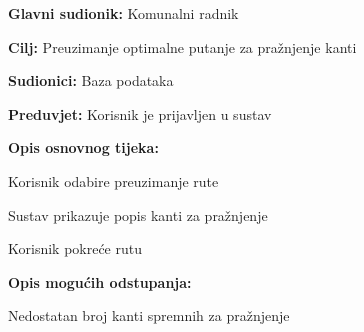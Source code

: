 	\noindent {}
					\begin{packed_item}
	
						\item \textbf{Glavni sudionik: } Komunalni radnik
						\item  \textbf{Cilj:} Preuzimanje optimalne putanje za pražnjenje kanti
						\item  \textbf{Sudionici:} Baza podataka
						\item  \textbf{Preduvjet:} Korisnik je prijavljen u sustav
						\item  \textbf{Opis osnovnog tijeka:}
						
						\item[] \begin{packed_enum}
	
							\item Korisnik odabire preuzimanje rute
							\item Sustav prikazuje popis kanti za pražnjenje
							\item Korisnik pokreće rutu
						\end{packed_enum}
						
						\item  \textbf{Opis mogućih odstupanja:}
						
						\item[] \begin{packed_item}
	
							\item[1.a] Nedostatan broj kanti spremnih za pražnjenje 
							
							\item[] \begin{packed_enum}
								
								\item 
								
							\end{packed_enum}
														
						\end{packed_item}
					\end{packed_item}


